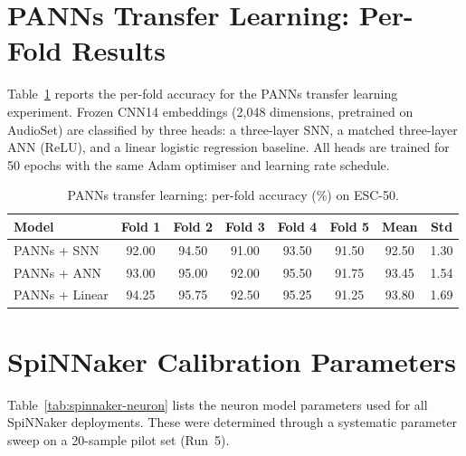 \section{PANNs Transfer Learning: Per-Fold Results}
\label{sec:app-panns}

Table~\ref{tab:panns-folds} reports the per-fold accuracy for the PANNs transfer learning experiment. Frozen CNN14 embeddings (2,048 dimensions, pretrained on AudioSet) are classified by three heads: a three-layer SNN, a matched three-layer ANN (ReLU), and a linear logistic regression baseline. All heads are trained for 50 epochs with the same Adam optimiser and learning rate schedule.

\begin{table}[H]
\centering
\caption{PANNs transfer learning: per-fold accuracy (\%) on ESC-50.}
\label{tab:panns-folds}
\small
\begin{tabular}{lccccccc}
\toprule
\textbf{Model} & \textbf{Fold 1} & \textbf{Fold 2} & \textbf{Fold 3} & \textbf{Fold 4} & \textbf{Fold 5} & \textbf{Mean} & \textbf{Std} \\
\midrule
PANNs + SNN    & 92.00 & 94.50 & 91.00 & 93.50 & 91.50 & 92.50 & 1.30 \\
PANNs + ANN    & 93.00 & 95.00 & 92.00 & 95.50 & 91.75 & 93.45 & 1.54 \\
PANNs + Linear & 94.25 & 95.75 & 92.50 & 95.25 & 91.25 & 93.80 & 1.69 \\
\bottomrule
\end{tabular}
\end{table}

\section{SpiNNaker Calibration Parameters}
\label{sec:app-spinnaker-params}

Table~\ref{tab:spinnaker-neuron} lists the neuron model parameters used for all SpiNNaker deployments. These were determined through a systematic parameter sweep on a 20-sample pilot set (Run~5).

